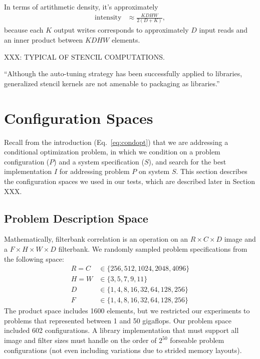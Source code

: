 \documentclass{sig-alternate}
\begin{document}
In terms of artithmetic density, it's approximately
\begin{align}
\mathrm{intensity} & \approx \frac {KDHW} {2(D+K)},
\end{align}
because each $K$ output writes corresponds to approximately $D$ input reads
and an inner product between $KDHW$ elements.

XXX: TYPICAL OF STENCIL COMPUTATIONS.

``Although the auto-tuning strategy has been successfully applied to libraries,
generalized stencil kernels are not amenable to packaging as libraries.''
\cite{kamil+etal:2009}


\cite{datta:2009}


\section{Configuration Spaces}

Recall from the introduction (Eq.~\ref{eq:condopt}) that we are addressing a
conditional optimization problem, in which we condition on a problem
configuration ($P$) and a system specification ($S$), and search for the best
implementation $I$ for addressing problem $P$ on system $S$.
This section describes the configuration spaces we used in our tests,
which are described later in Section XXX.


\subsection{Problem Description Space}

Mathematically, filterbank correlation is an operation on an $R \times C \times
D$ image and a $F \times H \times W \times D$ filterbank.
We randomly sampled problem specifications from the following space:
\begin{align*}
R = C & \in \{ 256, 512, 1024, 2048, 4096 \} \\
H = W & \in \{ 3, 5, 7, 9, 11 \} \\
D &  \in \{1, 4, 8, 16, 32, 64, 128, 256 \} \\
F &  \in \{1, 4, 8, 16, 32, 64, 128, 256 \}
\end{align*}
The product space
includes 1600 elements, but we restricted our experiments to problems that
represented between 1 and 50 gigaflops. Our problem space included 602
configurations. A library implementation that must support all image and
filter sizes must handle on the order of $2^{50}$ forseable
problem configurations (not even including variations due to strided memory
layouts).
\end{document}
